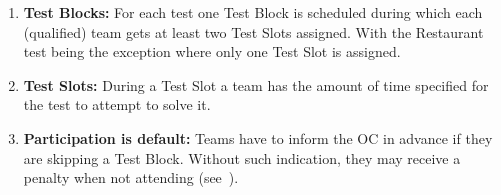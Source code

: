 \begin{enumerate}
	\item \textbf{Test Blocks:} For each test one Test Block is scheduled during which each (qualified) team gets at least two Test Slots assigned. With the Restaurant test being the exception where only one Test Slot is assigned.

	\item \textbf{Test Slots:} During a Test Slot a team has the amount of time specified for the test to attempt to solve it. 

	\item \textbf{Participation is default:} Teams have to inform the OC in advance if they are skipping a Test Block. Without such indication, they may receive a penalty when not attending (see~).
	
\end{enumerate}

